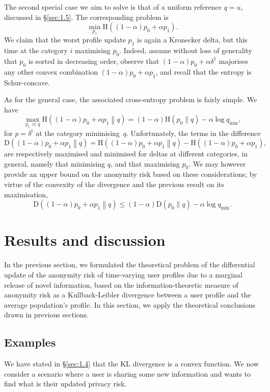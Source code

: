 The second special case we aim to solve is that of a uniform reference $q=u$, discussed in \S \ref{sec:1.5}. The corresponding problem is
$$\min_{p_1} \text{H}\left((1-\alpha)p_0+\alpha p_1\right).$$
We claim that the worst profile update $p_1$ is again a Kronecker delta, but this time at the category $i$ maximising $p_0$. Indeed, assume without loss of generality that $p_0$ is sorted in decreasing order, observe that $(1-\alpha)p_0+\alpha\delta^1$ majorises any other convex combination $(1-\alpha)p_0+\alpha p_1$, and recall that the entropy is Schur\hyp concave.

As for the general case, the associated cross\hyp entropy problem is fairly simple. We have
$$\max_{p_1\ll q} \text{H}\left((1-\alpha)p_0+\alpha p_1\middle\|q\right)=(1-\alpha)\text{H}(p_0\|q)-\alpha\log q_\text{min},$$
for $p=\delta^i$ at the category minimising~$q$. Unfortunately, the terms in the difference
$$\text{D}\left((1-\alpha)p_0+\alpha p_1\middle\|q\right)=\text{H}\left((1-\alpha)p_0+\alpha p_1\middle\|q\right)-\text{H}\left((1-\alpha)p_0+\alpha p_1\right),$$
are respectively maximised and minimised for deltas at different categories, in general, namely that minimising $q$, and that maximising $p_0$. We may however provide an upper bound on the anonymity risk based on these considerations; by virtue of the convexity of the divergence and the previous result on its maximisation,
$$\text{D}\left((1-\alpha)p_0+\alpha p_1\middle\|q\right)\leqslant(1-\alpha)\text{D}(p_0\|q)-\alpha\log q_\text{min}.$$



\section{Results and discussion}

In the previous section, we formulated the theoretical problem of the differential update of the anonymity risk of time-varying user profiles due to a marginal release of novel information, based on the information\hyp theoretic measure of anonymity risk as a Kullback\hyp Leibler divergence between a user profile and the average population's profile. In this section, we apply the theoretical conclusions drawn in previous sections.

\subsection{Examples}

We have stated in \S \ref{sec:1.4} that the KL divergence is a convex function. We now consider a scenario where a user is sharing some new information and wants to find what is their updated privacy risk.

